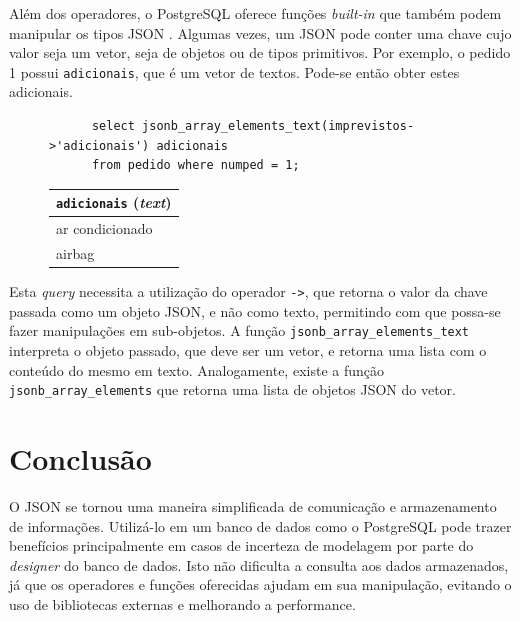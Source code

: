 \documentclass[a4paper, 12pt]{article}
\begin{document}
  Além dos operadores, o PostgreSQL oferece funções
  \emph{built-in} que também podem manipular os tipos 
  JSON \cite{pdfunctionjson}. Algumas vezes, um JSON
  pode conter uma chave cujo valor seja um vetor, 
  seja de objetos ou de tipos primitivos. Por exemplo,
  o pedido 1 possui  \verb|adicionais|, que é um vetor 
  de textos.  Pode-se então obter estes adicionais.
  
  \begin{figure}[h!]
    \centering
    \begin{verbatim}
      select jsonb_array_elements_text(imprevistos->'adicionais') adicionais 
      from pedido where numped = 1;
    \end{verbatim}
    \begin{tabular}{l}
      \toprule
      \texttt{adicionais} (\textit{text}) \\
      \midrule
      ar condicionado \\
      airbag \\
      \bottomrule
    \end{tabular}
  \end{figure}
  
  Esta \emph{query} necessita a utilização do operador
  \verb|->|, que retorna o valor da chave passada como
  um objeto JSON, e não como texto, permitindo com
  que possa-se fazer manipulações em sub-objetos.
  A função \verb|jsonb_array_elements_text| interpreta
  o objeto passado, que deve ser um vetor, e retorna
  uma lista com o conteúdo do mesmo em texto. 
  Analogamente, existe a função \verb|jsonb_array_elements|
  que retorna uma lista de objetos JSON do vetor.
  
  \section{Conclusão}
  
  O JSON se tornou uma maneira simplificada de comunicação
  e armazenamento de informações. Utilizá-lo em um
  banco de dados como o PostgreSQL pode trazer benefícios
  principalmente em casos de incerteza de modelagem
  por parte do \emph{designer} do banco de dados.
  Isto não dificulta a consulta aos dados armazenados,
  já que os operadores e funções oferecidas ajudam em sua
  manipulação, evitando o uso de bibliotecas externas
  e melhorando a performance.

  \printbibliography
\end{document}
